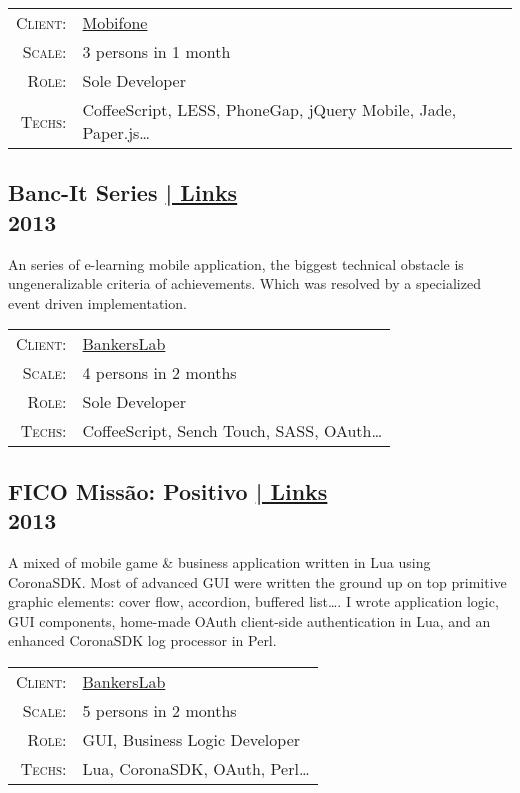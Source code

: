 \documentclass[a4paper,10pt]{article}
\begin{document}
\begin{tabular}{rl}
    \textsc{Client:} & \href{http://www.mobifone.com.vn/}{Mobifone}\\
    \textsc{Scale:} & 3 persons in 1 month\\
    \textsc{Role:} & Sole Developer\\
    \textsc{Techs:} & CoffeeScript, LESS, PhoneGap, jQuery Mobile, Jade, Paper.js\ldots\\
\end{tabular}

\subsection*{Banc-It Series \hfill \footnotesize {\hyperlink{bancit-links}{| Links}}\\\small 2013}
An series of e-learning mobile application, the biggest technical obstacle is ungeneralizable criteria of achievements. Which was resolved by a specialized event driven implementation.

\begin{tabular}{rl}
    \textsc{Client:} & \href{http://bankerslab.com/}{BankersLab}\\
    \textsc{Scale:} & 4 persons in 2 months\\
    \textsc{Role:} & Sole Developer\\
    \textsc{Techs:} & CoffeeScript, Sench Touch, SASS, OAuth\ldots
\end{tabular}

\subsection*{FICO Missão: Positivo \hfill \footnotesize {\hyperlink{fico-links}{| Links}}\\\small 2013}
A mixed of mobile game \& business application written in Lua using CoronaSDK. Most of advanced GUI were written the ground up on top primitive graphic elements: cover flow, accordion, buffered list\ldots. I wrote application logic, GUI components, home-made OAuth client-side authentication in Lua, and an enhanced CoronaSDK log processor in Perl.

\begin{tabular}{rl}
    \textsc{Client:} & \href{http://bankerslab.com/}{BankersLab}\\
    \textsc{Scale:} & 5 persons in 2 months\\
    \textsc{Role:} & GUI, Business Logic Developer\\
    \textsc{Techs:} & Lua, CoronaSDK, OAuth, Perl\ldots
\end{tabular}
\end{document}
